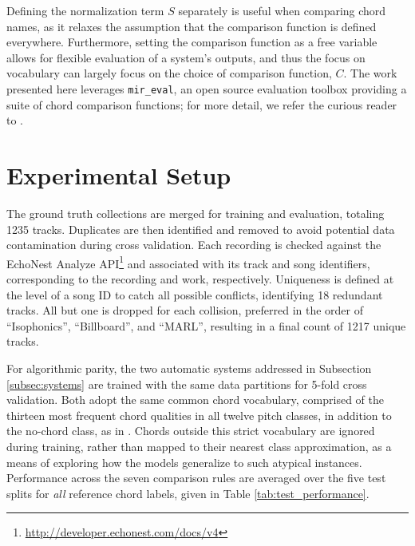 \documentclass{article}
\begin{document}
Defining the normalization term $S$ separately is useful when comparing chord names, as it relaxes the assumption that the comparison function is defined everywhere.
Furthermore, setting the comparison function as a free variable allows for flexible evaluation of a system's outputs, and thus the focus on vocabulary can largely focus on the choice of comparison function, $C$.
The work presented here leverages \texttt{mir\_eval}, an open source evaluation toolbox providing a suite of chord comparison functions;
for more detail, we refer the curious reader to \cite{Raffel2014Eval}.


\section{Experimental Setup}
\label{sec:exp_setup}

The ground truth collections are merged for training and evaluation, totaling 1235 tracks.
Duplicates are then identified and removed to avoid potential data contamination during cross validation.
Each recording is checked against the EchoNest Analyze API\footnote{\url{http://developer.echonest.com/docs/v4}} and associated with its track and song identifiers, corresponding to the recording and work, respectively.
Uniqueness is defined at the level of a song ID to catch all possible conflicts, identifying 18 redundant tracks.
All but one is dropped for each collision, preferred in the order of ``Isophonics'', ``Billboard'', and ``MARL'', resulting in a final count of 1217 unique tracks.

For algorithmic parity, the two automatic systems addressed in Subsection \ref{subsec:systems} are trained with the same data partitions for 5-fold cross validation.
Both adopt the same common chord vocabulary, comprised of the thirteen most frequent chord qualities in all twelve pitch classes, in addition to the no-chord class, as in \cite{Cho2014Improved}.
Chords outside this strict vocabulary are ignored during training, rather than mapped to their nearest class approximation, as a means of exploring how the models generalize to such atypical instances.
Performance across the seven comparison rules are averaged over the five test splits for \emph{all} reference chord labels, given in Table \ref{tab:test_performance}.
\end{document}
